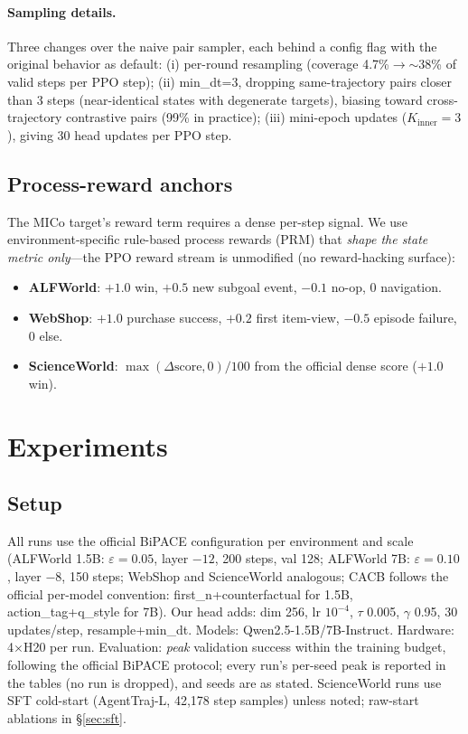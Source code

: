 \documentclass[sigconf]{acmart}
\begin{document}
\paragraph{Sampling details.} Three changes over the naive pair
sampler, each behind a config flag with the original behavior as
default: (i) per-round resampling (coverage 4.7\%$\to$$\sim$38\% of
valid steps per PPO step); (ii) min\_dt=3, dropping same-trajectory
pairs closer than 3 steps (near-identical states with degenerate
targets), biasing toward cross-trajectory contrastive pairs (99\% in
practice); (iii) mini-epoch updates ($K_{\text{inner}}=3$), giving 30
head updates per PPO step.

\subsection{Process-reward anchors}
\label{sec:prm}

The MICo target's reward term requires a dense per-step signal. We use
environment-specific rule-based process rewards (PRM) that
\emph{shape the state metric only}---the PPO reward stream is
unmodified (no reward-hacking surface):

\begin{itemize}
\item \textbf{ALFWorld}: $+1.0$ win, $+0.5$ new subgoal event, $-0.1$
no-op, $0$ navigation.
\item \textbf{WebShop}: $+1.0$ purchase success, $+0.2$ first
item-view, $-0.5$ episode failure, $0$ else.
\item \textbf{ScienceWorld}: $\max(\Delta\text{score},0)/100$ from the
official dense score ($+1.0$ win).
\end{itemize}

\section{Experiments}
\label{sec:exp}

\subsection{Setup}
\label{sec:setup}

All runs use the official BiPACE configuration per environment and
scale (ALFWorld 1.5B: $\varepsilon{=}0.05$, layer $-12$, 200 steps, val
128; ALFWorld 7B: $\varepsilon{=}0.10$, layer $-8$, 150 steps; WebShop
and ScienceWorld analogous; CACB follows the official per-model
convention: first\_n+counterfactual for 1.5B, action\_tag+q\_style for
7B). Our head adds: dim 256, lr $10^{-4}$, $\tau$ 0.005, $\gamma$ 0.95,
30 updates/step, resample+min\_dt. Models: Qwen2.5-1.5B/7B-Instruct.
Hardware: 4$\times$H20 per run. Evaluation: \emph{peak} validation
success within the training budget, following the official BiPACE
protocol; every run's per-seed peak is reported in the tables (no
run is dropped), and seeds are as stated. ScienceWorld
runs use SFT cold-start (AgentTraj-L, 42{,}178 step samples) unless
noted; raw-start ablations in \S\ref{sec:sft}.
\end{document}
